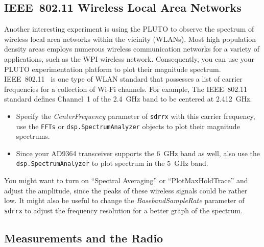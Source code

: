 \documentclass[letterpaper,12pt]{article}
\begin{document}
\subsection{IEEE~802.11 Wireless Local Area Networks}
Another interesting experiment is using the PLUTO to observe the spectrum of wireless local area networks within the vicinity (WLANs).
Most high population density areas employs numerous wireless communication networks for a variety of applications, such as the WPI wireless network.
Consequently, you can use your PLUTO experimentation platform to plot their magnitude spectrum.
IEEE~802.11~\cite{wikipedia_ieee802.11} is one type of WLAN standard that possesses a list of carrier frequencies for a collection of Wi-Fi channels.
For example, The IEEE~802.11 standard
defines Channel~1 of the 2.4~GHz band to be centered at 2.412~GHz.

\begin{itemize}
 \item Specify the \textit{CenterFrequency} parameter of \texttt{sdrrx} with this carrier frequency, use the \texttt{FFTs} or \texttt{dsp.SpectrumAnalyzer} objects to plot their magnitude spectrums.
 \item Since your AD9364 transceiver supports the 6~GHz band as well, also use the \texttt{dsp.SpectrumAnalyzer} to plot spectrum in the 5~GHz band.
\end{itemize}

\noindent
You might want to turn on ``Spectral Averaging'' or ``PlotMaxHoldTrace'' and adjust the amplitude,
since the peaks of these wireless signals could be rather low. It might also be useful to change the \textit{BasebandSampleRate} parameter of \texttt{sdrrx} to adjust the frequency resolution for a better graph of the spectrum.


\subsection{Measurements and the Radio}
\end{document}
